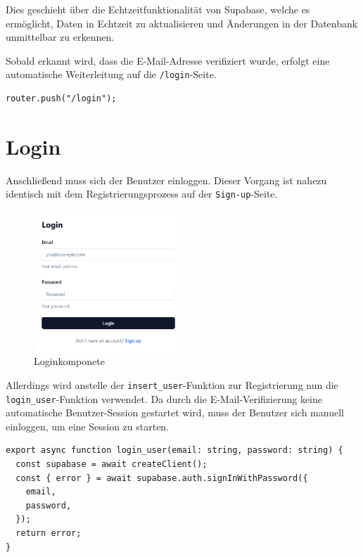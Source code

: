 \begin{inhalt}
Dies geschieht über die Echtzeitfunktionalität von Supabase, welche es ermöglicht, Daten in Echtzeit zu aktualisieren und Änderungen in der Datenbank unmittelbar zu erkennen.

Sobald erkannt wird, dass die E-Mail-Adresse verifiziert wurde, erfolgt eine automatische Weiterleitung auf die \texttt{/login}-Seite.

\begin{lstlisting}[style=mytsx]
      router.push("/login");
\end{lstlisting}     


\section{Login}
\label{ref:Login}
Anschließend muss sich der Benutzer einloggen. Dieser Vorgang ist nahezu identisch mit dem Registrierungsprozess auf der \texttt{Sign-up}-Seite. 

\begin{figure}[!htb]
\centering
\includegraphics[width=0.5\textwidth]{files/Thomas/pics/Website/Login/login.png}
\caption[Loginkomponete]{Loginkomponete}
\label{fig:gehaeuse_internet_bild}
\end{figure}


Allerdings wird anstelle der \texttt{insert\_user}-Funktion zur Registrierung nun die \texttt{login\_user}-Funktion verwendet.
Da durch die E-Mail-Verifizierung keine automatische Benutzer-Session gestartet wird, muss der Benutzer sich manuell einloggen, um eine Session zu starten.

\begin{lstlisting}[style=mytsx]
export async function login_user(email: string, password: string) {
  const supabase = await createClient();
  const { error } = await supabase.auth.signInWithPassword({
    email,
    password,
  });
  return error;
}
\end{lstlisting}


\end{inhalt}
